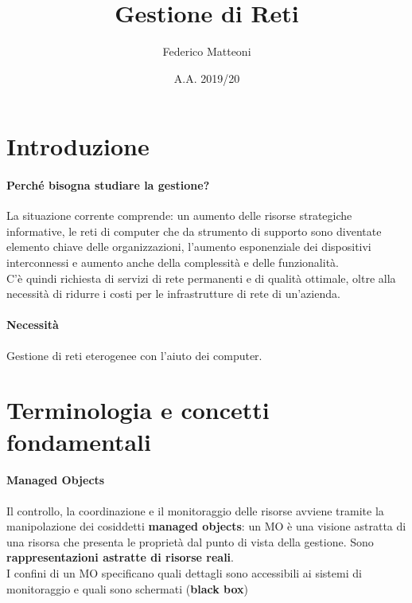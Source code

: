 \documentclass[10pt]{book}
\begin{document}
\renewcommand*\contentsname{Indice}
\title{Gestione di Reti}
\author{Federico Matteoni}
\date{A.A. 2019/20}
\maketitle
\tableofcontents
\pagebreak
\section*{Introduzione}
\paragraph{Perché bisogna studiare la gestione?} La situazione corrente comprende: un aumento delle risorse strategiche informative, le reti di computer che da strumento di supporto sono diventate elemento chiave delle organizzazioni, l'aumento esponenziale dei dispositivi interconnessi e aumento anche della complessità e delle funzionalità.\\
C'è quindi richiesta di servizi di rete permanenti e di qualità ottimale, oltre alla necessità di ridurre i costi per le infrastrutture di rete di un'azienda.
\paragraph{Necessità} Gestione di reti eterogenee con l'aiuto dei computer.
\section*{Terminologia e concetti fondamentali}
\paragraph{Managed Objects} Il controllo, la coordinazione e il monitoraggio delle risorse avviene tramite la manipolazione dei cosiddetti \textbf{managed objects}: un MO è una visione astratta di una risorsa che presenta le proprietà dal punto di vista della gestione. Sono \textbf{rappresentazioni astratte di risorse reali}.\\
I confini di un MO specificano quali dettagli sono accessibili ai sistemi di monitoraggio e quali sono schermati (\textbf{black box})
\end{document}
